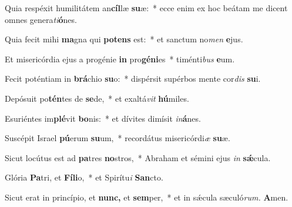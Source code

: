 \item Quia respéxit humilitátem an\textbf{cíl}læ \textbf{su}æ:~* ecce enim ex hoc beátam me dicent omnes genera\tinyhspace\textit{ti}\textbf{ó}nes.
\item Quia fecit mihi \textbf{ma}gna qui \textbf{pot}\textbf{ens} est:~* et san\-ctum no\textit{men} \textbf{e}jus.
\item Et misericórdia ejus a progénie \textbf{in} pro\textbf{gé}\textbf{ni}es~* timénti\textit{bus} \textbf{e}um.
\item Fecit poténtiam in \textbf{brá}chio \textbf{su}o:~* dispérsit supérbos mente cor\textit{dis} \textbf{su}i.
\item Depósuit po\textbf{tén}tes de \textbf{se}de,~* et exaltá\textit{vit} \textbf{hú}miles.
\item Esuriéntes im\textbf{plé}vit \textbf{bo}nis:~* et dívites dimísit \textit{in}\textbf{á}nes.
\item Suscépit Israel \textbf{pú}erum \textbf{su}um,~* recordátus misericórdi\tinyhspace\textit{æ} \textbf{su}æ.
\item Sicut locútus est ad \textbf{pa}tres \textbf{no}stros,~* Abraham et sémini ejus \textit{in} \textbf{sǽ}cula.
\item Glória \textbf{Pa}tri, et \textbf{Fí}\textbf{li}o,~* et Spirítu\tinyhspace\textit{i} \textbf{San}cto.
\item Sicut erat in princípio, et \textbf{nunc,} et \textbf{sem}per,~* et in sǽcula sæculó\textit{rum.} \textbf{A}men.

